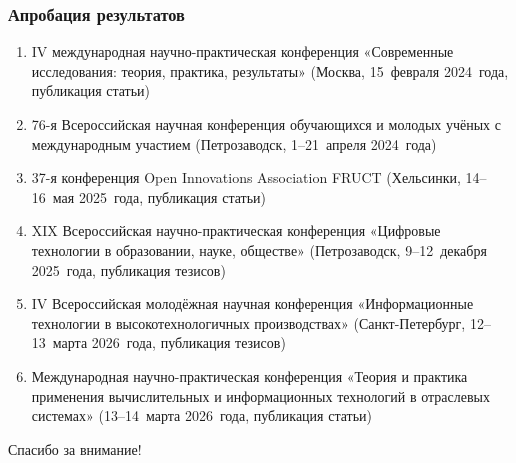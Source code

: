 \begin{frame}[t,allowframebreaks] %
    \frametitle{Апробация результатов}
    \begin{enumerate}
        \item IV международная научно-практическая конференция «Современные исследования: теория, практика, результаты» (Москва, 15~февраля 2024~года, публикация статьи)
        \item 76-я Всероссийская научная конференция обучающихся и молодых учёных с международным участием (Петрозаводск, 1--21~апреля 2024~года)
        \item 37-я конференция Open Innovations Association FRUCT (Хельсинки, 14--16~мая 2025~года, публикация статьи)
        \item XIX Всероссийская научно-практическая конференция «Цифровые технологии в образовании, науке, обществе» (Петрозаводск, 9--12~декабря 2025~года, публикация тезисов)
        \item IV Всероссийская молодёжная научная конференция «Информационные технологии в высокотехнологичных производствах» (Санкт-Петербург, 12--13~марта 2026~года, публикация тезисов)
        \item Международная научно-практическая конференция «Теория и практика применения вычислительных и информационных технологий в отраслевых системах» (13--14~марта 2026~года, публикация статьи)
    \end{enumerate}
\end{frame}

\begin{frame} %
    \begin{center}
        \Huge
        Спасибо за внимание!
    \end{center}
\end{frame}
